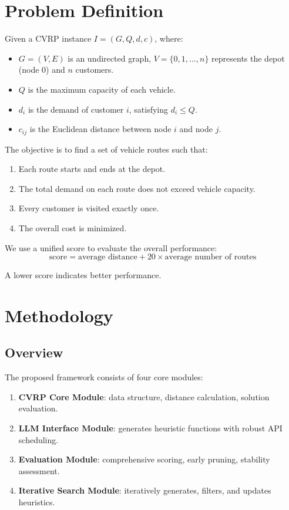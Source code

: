 \documentclass{article}
\begin{document}
\section{Problem Definition}

Given a CVRP instance $I = (G, Q, d, c)$, where:
\begin{itemize}
    \item $G = (V, E)$ is an undirected graph, $V = \{0, 1, ..., n\}$ represents the depot (node 0) and $n$ customers.
    \item $Q$ is the maximum capacity of each vehicle.
    \item $d_i$ is the demand of customer $i$, satisfying $d_i \leq Q$.
    \item $c_{ij}$ is the Euclidean distance between node $i$ and node $j$.
\end{itemize}

The objective is to find a set of vehicle routes such that:
\begin{enumerate}
    \item Each route starts and ends at the depot.
    \item The total demand on each route does not exceed vehicle capacity.
    \item Every customer is visited exactly once.
    \item The overall cost is minimized.
\end{enumerate}

We use a unified score to evaluate the overall performance:
\begin{equation}
    \text{score} = \text{average distance} + 20 \times \text{average number of routes}
\end{equation}

A lower score indicates better performance.

\section{Methodology}

\subsection{Overview}

The proposed framework consists of four core modules:
\begin{enumerate}
    \item \textbf{CVRP Core Module}: data structure, distance calculation, solution evaluation.
    \item \textbf{LLM Interface Module}: generates heuristic functions with robust API scheduling.
    \item \textbf{Evaluation Module}: comprehensive scoring, early pruning, stability assessment.
    \item \textbf{Iterative Search Module}: iteratively generates, filters, and updates heuristics.
\end{enumerate}
\end{document}
